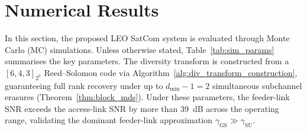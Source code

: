 \documentclass[lettersize,journal]{IEEEtran}
\providecommand{\DIFaddend}{} %
\DeclareRobustCommand{\DIFaddend}{\DIFOaddend \let\includegraphics\DIFOincludegraphics} %
\begin{document}
\DIFaddend \section{Numerical Results}
\label{sec:results}
In this section, the proposed LEO SatCom system is evaluated through Monte Carlo (MC)
  simulations. Unless otherwise stated, Table~\ref{tab:sim_params}
  summarises the key parameters. The diversity transform is
  constructed from a $[6, 4, 3]_{2^3}$ Reed--Solomon code via
  Algorithm~\ref{alg:div_transform_construction}, guaranteeing
  full rank recovery under up to $d_{\min} - 1 = 2$ simultaneous
  subchannel erasures (Theorem~\ref{thm:block_mds}). Under these
  parameters, the feeder-link SNR exceeds the access-link SNR by
  more than 39~dB across the operating range, validating the
  dominant feeder-link approximation
  $\gamma_{\mathrm{GS}} \gg \gamma_{\mathrm{SU}}$.
\end{document}
